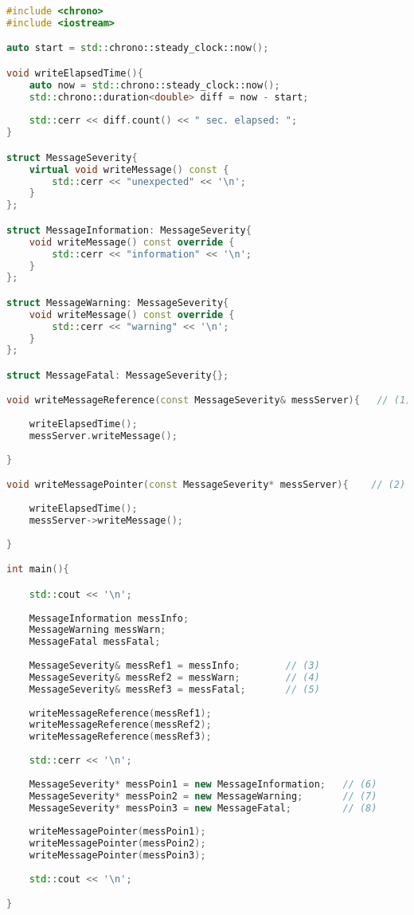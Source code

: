 \begin{lstlisting}[caption={Dynamic polymophism \cite{poly}},label={code:dynamic},language=C++]
#include <chrono>
#include <iostream>

auto start = std::chrono::steady_clock::now();

void writeElapsedTime(){
    auto now = std::chrono::steady_clock::now();
    std::chrono::duration<double> diff = now - start;
  
    std::cerr << diff.count() << " sec. elapsed: ";
}

struct MessageSeverity{                         
	virtual void writeMessage() const {         
		std::cerr << "unexpected" << '\n';
	}
};

struct MessageInformation: MessageSeverity{     
	void writeMessage() const override {        
		std::cerr << "information" << '\n';
	}
};

struct MessageWarning: MessageSeverity{         
	void writeMessage() const override {        
		std::cerr << "warning" << '\n';
	}
};

struct MessageFatal: MessageSeverity{};

void writeMessageReference(const MessageSeverity& messServer){   // (1)
	
	writeElapsedTime();
	messServer.writeMessage();
	
}

void writeMessagePointer(const MessageSeverity* messServer){    // (2)
	
	writeElapsedTime();
	messServer->writeMessage();
	
}

int main(){

    std::cout << '\n';
  
    MessageInformation messInfo;
    MessageWarning messWarn;
    MessageFatal messFatal;
  
    MessageSeverity& messRef1 = messInfo;        // (3)      
    MessageSeverity& messRef2 = messWarn;        // (4)
    MessageSeverity& messRef3 = messFatal;       // (5)
  
    writeMessageReference(messRef1);              
    writeMessageReference(messRef2);
    writeMessageReference(messRef3);
  
    std::cerr << '\n';
  
    MessageSeverity* messPoin1 = new MessageInformation;   // (6)
    MessageSeverity* messPoin2 = new MessageWarning;       // (7)
    MessageSeverity* messPoin3 = new MessageFatal;         // (8)
  
    writeMessagePointer(messPoin1);               
    writeMessagePointer(messPoin2);
    writeMessagePointer(messPoin3);
  
    std::cout << '\n';

}

\end{lstlisting}

